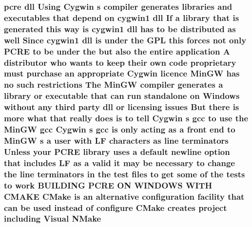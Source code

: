 \subsubsection[{\texorpdfstring{N\+Make}{NMake}}]{ {\bf pcre} dll Using Cygwin {\bf s} {\bf compiler} generates {\bf libraries} and executables that depend {\bf on} cygwin1 dll If {\bf a} {\bf library} that {\bf is} {\bf generated} {\bf this} {\bf way} {\bf is} cygwin1 dll has {\bf to} {\bf be} {\bf distributed} {\bf as} well Since cygwin1 dll {\bf is} under the {\bf G\+PL} {\bf this} forces {\bf not} only {\bf P\+C\+RE} {\bf to} {\bf be} under the but also the entire application {\bf A} distributor who wants {\bf to} keep their own {\bf code} proprietary must purchase an appropriate Cygwin {\bf licence} {\bf Min\+GW} has no such restrictions The {\bf Min\+GW} {\bf compiler} generates {\bf a} {\bf library} {\bf or} executable that {\bf can} {\bf run} standalone {\bf on} {\bf Windows} without {\bf any} third party dll {\bf or} licensing issues But there {\bf is} more {\bf what} that really does {\bf is} {\bf to} tell Cygwin {\bf s} {\bf gcc} {\bf to} use the {\bf Min\+GW} {\bf gcc} Cygwin {\bf s} {\bf gcc} {\bf is} only acting {\bf as} {\bf a} front {\bf end} {\bf to} {\bf Min\+GW} {\bf s} {\bf a} user {\bf with} {\bf LF} {\bf characters} {\bf as} {\bf line} terminators Unless your {\bf P\+C\+RE} {\bf library} uses {\bf a} {\bf default} {\bf newline} {\bf option} that includes {\bf LF} {\bf as} {\bf a} valid {\bf it} may {\bf be} necessary {\bf to} change the {\bf line} terminators {\bf in} the test {\bf files} {\bf to} get some {\bf of} the {\bf tests} {\bf to} work B\+U\+I\+L\+D\+I\+NG {\bf P\+C\+RE} ON W\+I\+N\+D\+O\+WS W\+I\+TH C\+M\+A\+KE C\+Make {\bf is} an alternative configuration {\bf facility} that {\bf can} {\bf be} {\bf used} instead {\bf of} {\bf configure} C\+Make creates {\bf project} including Visual N\+Make}\hypertarget{NON-AUTOTOOLS-BUILD_8txt_afcb88df13a8143a5633c6137fd075306}{}\label{NON-AUTOTOOLS-BUILD_8txt_afcb88df13a8143a5633c6137fd075306}
